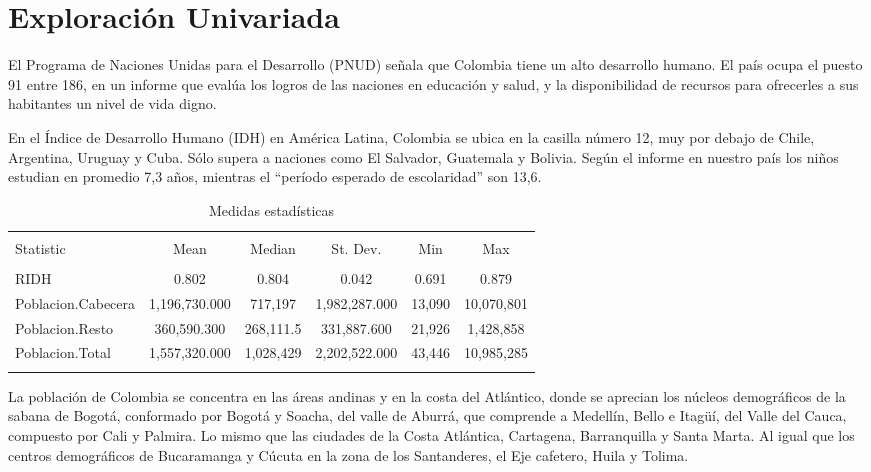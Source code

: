 \section{Exploración Univariada}\label{univariada}


El Programa de Naciones Unidas para el Desarrollo (PNUD) señala que Colombia tiene un alto desarrollo humano. El país ocupa el puesto 91 entre 186, en un informe que evalúa los logros de las naciones en educación y salud, y la disponibilidad de recursos para ofrecerles a sus habitantes un nivel de vida digno.

En el Índice de Desarrollo Humano (IDH) en América Latina, Colombia se ubica en la casilla número 12, muy por debajo de Chile, Argentina, Uruguay y Cuba. Sólo supera a naciones como El Salvador, Guatemala y Bolivia. Según el informe en nuestro país los niños estudian en promedio 7,3 años, mientras el “período esperado de escolaridad” son 13,6.


\begin{table}[!htbp] \centering 
  \caption{Medidas estadísticas} 
  \label{stats} 
\begin{tabular}{@{\extracolsep{5pt}}lccccc} 
\\[-1.8ex]\hline 
\hline \\[-1.8ex] 
Statistic & \multicolumn{1}{c}{Mean} & \multicolumn{1}{c}{Median} & \multicolumn{1}{c}{St. Dev.} & \multicolumn{1}{c}{Min} & \multicolumn{1}{c}{Max} \\ 
\hline \\[-1.8ex] 
RIDH & 0.802 & 0.804 & 0.042 & 0.691 & 0.879 \\ 
Poblacion.Cabecera & 1,196,730.000 & 717,197 & 1,982,287.000 & 13,090 & 10,070,801 \\ 
Poblacion.Resto & 360,590.300 & 268,111.5 & 331,887.600 & 21,926 & 1,428,858 \\ 
Poblacion.Total & 1,557,320.000 & 1,028,429 & 2,202,522.000 & 43,446 & 10,985,285 \\ 
\hline \\[-1.8ex] 
\end{tabular} 
\end{table} 
La población de Colombia se concentra en las áreas andinas y en la costa del Atlántico, donde se aprecian los núcleos demográficos de la sabana de Bogotá, conformado por Bogotá y Soacha, del valle de Aburrá, que comprende a Medellín, Bello e Itagüí, del Valle del Cauca, compuesto por Cali y Palmira. Lo mismo que las ciudades de la Costa Atlántica, Cartagena, Barranquilla y Santa Marta. Al igual que los centros demográficos de Bucaramanga y Cúcuta en la zona de los Santanderes, el Eje cafetero, Huila y Tolima.

